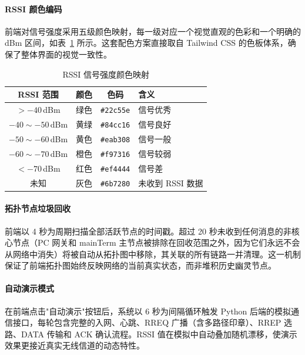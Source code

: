 \documentclass[12pt,a4paper]{ctexart}
\newcommand{\tblheaderstyle}{\sffamily\small\color{white}}
\begin{document}
\paragraph{RSSI 颜色编码}
前端对信号强度采用五级颜色映射，每一级对应一个视觉直观的色彩和一个明确的 dBm 区间，如表~\ref{tab:rssicolor} 所示。这套配色方案直接取自 Tailwind CSS 的色板体系，确保了整体界面的视觉一致性。

\begin{table}[htbp]
\centering
\caption{RSSI 信号强度颜色映射}
\label{tab:rssicolor}
\begin{tabularx}{\textwidth}{c c c >{\raggedright\arraybackslash}X}
\toprule
\rowcolor{tblhead}\tblheaderstyle RSSI 范围 & \tblheaderstyle 颜色 & \tblheaderstyle 色码 & \tblheaderstyle 含义 \\
\midrule
$> -40$\,dBm           & 绿色  & \texttt{\#22c55e} & 信号优秀 \\
$-40 \sim -50$\,dBm    & 黄绿  & \texttt{\#84cc16} & 信号良好 \\
$-50 \sim -60$\,dBm    & 黄色  & \texttt{\#eab308} & 信号一般 \\
$-60 \sim -70$\,dBm    & 橙色  & \texttt{\#f97316} & 信号较弱 \\
$< -70$\,dBm           & 红色  & \texttt{\#ef4444} & 信号差 \\
未知                   & 灰色  & \texttt{\#6b7280} & 未收到 RSSI 数据 \\
\bottomrule
\end{tabularx}
\end{table}

\paragraph{拓扑节点垃圾回收}
前端以 4 秒为周期扫描全部活跃节点的时间戳。超过 20 秒未收到任何消息的非核心节点（PC 网关和 mainTerm 主节点被排除在回收范围之外，因为它们永远不会从网络中消失）将被自动从拓扑图中移除，其关联的所有链路一并清理。这一机制保证了前端拓扑图始终反映网络的当前真实状态，而非堆积历史幽灵节点。

\paragraph{自动演示模式}
在前端点击"自动演示"按钮后，系统以 6 秒为间隔循环触发 Python 后端的模拟通信接口，每轮包含完整的入网、心跳、RREQ 广播（含多路径印章）、RREP 选路、DATA 传输和 ACK 确认流程。RSSI 值在模拟中自动叠加随机漂移，使演示效果更接近真实无线信道的动态特性。
\end{document}
